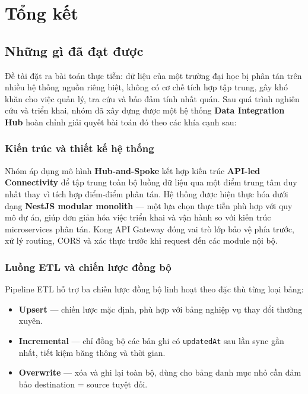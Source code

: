 \newpage
\section{Tổng kết}
\label{sec:conclusion}

\subsection{Những gì đã đạt được}

Đề tài đặt ra bài toán thực tiễn: dữ liệu của một trường đại học bị phân tán trên nhiều hệ thống nguồn riêng biệt, không có cơ chế tích hợp tập trung, gây khó khăn cho việc quản lý, tra cứu và bảo đảm tính nhất quán. Sau quá trình nghiên cứu và triển khai, nhóm đã xây dựng được một hệ thống \textbf{Data Integration Hub} hoàn chỉnh giải quyết bài toán đó theo các khía cạnh sau:

\subsubsection{Kiến trúc và thiết kế hệ thống}

Nhóm áp dụng mô hình \textbf{Hub-and-Spoke} kết hợp kiến trúc \textbf{API-led Connectivity} để tập trung toàn bộ luồng dữ liệu qua một điểm trung tâm duy nhất thay vì tích hợp điểm-điểm phân tán. Hệ thống được hiện thực hóa dưới dạng \textbf{NestJS modular monolith} — một lựa chọn thực tiễn phù hợp với quy mô dự án, giúp đơn giản hóa việc triển khai và vận hành so với kiến trúc microservices phân tán. Kong API Gateway đóng vai trò lớp bảo vệ phía trước, xử lý routing, CORS và xác thực trước khi request đến các module nội bộ.

\subsubsection{Luồng ETL và chiến lược đồng bộ}

Pipeline ETL hỗ trợ ba chiến lược đồng bộ linh hoạt theo đặc thù từng loại bảng:
\begin{itemize}
    \item \textbf{Upsert} — chiến lược mặc định, phù hợp với bảng nghiệp vụ thay đổi thường xuyên.
    \item \textbf{Incremental} — chỉ đồng bộ các bản ghi có \texttt{updatedAt} sau lần sync gần nhất, tiết kiệm băng thông và thời gian.
    \item \textbf{Overwrite} — xóa và ghi lại toàn bộ, dùng cho bảng danh mục nhỏ cần đảm bảo destination = source tuyệt đối.
\end{itemize}

